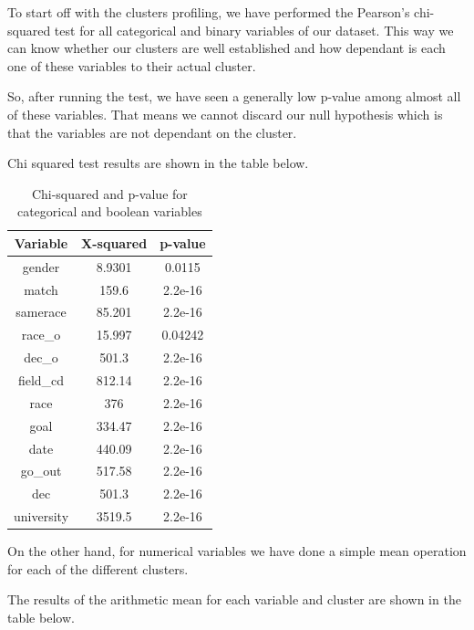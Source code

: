 
To start off with the clusters profiling, we have performed the Pearson's chi-squared test for all categorical and binary variables of our dataset. This way we can know whether our clusters are well established and how dependant is each one of these variables to their actual cluster.

So, after running the test, we have seen a generally low p-value among almost all of these variables. That means we cannot discard our null hypothesis which is that the variables are not dependant on the cluster.

Chi squared test results are shown in the table below.
\newline


\begin{table}[h!]
\centering
\begin{tabular}{|c| c| c|}
 \hline
 \textbf{Variable} & \textbf{X-squared} & \textbf{p-value}\\ [0.5ex]
 \hline\hline
 gender & 8.9301 & 0.0115\\
 match & 159.6 & 2.2e-16\\
 samerace & 85.201 & 2.2e-16\\
 race\_o & 15.997 & 0.04242\\
 dec\_o & 501.3 & 2.2e-16\\
 field\_cd & 812.14 & 2.2e-16\\
 race & 376 & 2.2e-16\\
 goal & 334.47 & 2.2e-16\\
 date & 440.09 & 2.2e-16\\
 go\_out & 517.58 & 2.2e-16\\
 dec & 501.3 & 2.2e-16\\
 university & 3519.5 & 2.2e-16\\
 \hline
\end{tabular}
\caption{Chi-squared and p-value for categorical and boolean variables}
\label{table:1}
\end{table}

\newpage
On the other hand, for numerical variables we have done a simple mean operation for each of the different clusters.

The results of the arithmetic mean for each variable and cluster are shown in the table below.
\newline

